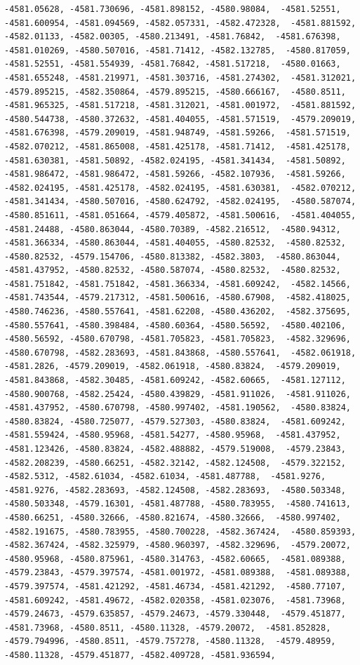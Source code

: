 \documentclass[
]{article}
\begin{document}
\begin{verbatim}
-4581.05628, -4581.730696, -4581.898152, -4580.98084,  -4581.52551, -4581.600954, -4581.094569, -4582.057331, -4582.472328,  -4581.881592, -4582.01133, -4582.00305, -4580.213491, -4581.76842,  -4581.676398, -4581.010269, -4580.507016, -4581.71412, -4582.132785,  -4580.817059, -4581.52551, -4581.554939, -4581.76842, -4581.517218,  -4580.01663, -4581.655248, -4581.219971, -4581.303716, -4581.274302,  -4581.312021, -4579.895215, -4582.350864, -4579.895215, -4580.666167,  -4580.8511, -4581.965325, -4581.517218, -4581.312021, -4581.001972,  -4581.881592, -4580.544738, -4580.372632, -4581.404055, -4581.571519,  -4579.209019, -4581.676398, -4579.209019, -4581.948749, -4581.59266,  -4581.571519, -4582.070212, -4581.865008, -4581.425178, -4581.71412,  -4581.425178, -4581.630381, -4581.50892, -4582.024195, -4581.341434,  -4581.50892, -4581.986472, -4581.986472, -4581.59266, -4582.107936,  -4581.59266, -4582.024195, -4581.425178, -4582.024195, -4581.630381,  -4582.070212, -4581.341434, -4580.507016, -4580.624792, -4582.024195,  -4580.587074, -4580.851611, -4581.051664, -4579.405872, -4581.500616,  -4581.404055, -4581.24488, -4580.863044, -4580.70389, -4582.216512,  -4580.94312, -4581.366334, -4580.863044, -4581.404055, -4580.82532,  -4580.82532, -4580.82532, -4579.154706, -4580.813382, -4582.3803,  -4580.863044, -4581.437952, -4580.82532, -4580.587074, -4580.82532,  -4580.82532, -4581.751842, -4581.751842, -4581.366334, -4581.609242,  -4582.14566, -4581.743544, -4579.217312, -4581.500616, -4580.67908,  -4582.418025, -4580.746236, -4580.557641, -4581.62208, -4580.436202,  -4582.375695, -4580.557641, -4580.398484, -4580.60364, -4580.56592,  -4580.402106, -4580.56592, -4580.670798, -4581.705823, -4581.705823,  -4582.329696, -4580.670798, -4582.283693, -4581.843868, -4580.557641,  -4582.061918, -4581.2826, -4579.209019, -4582.061918, -4580.83824,  -4579.209019, -4581.843868, -4582.30485, -4581.609242, -4582.60665,  -4581.127112, -4580.900768, -4582.25424, -4580.439829, -4581.911026,  -4581.911026, -4581.437952, -4580.670798, -4580.997402, -4581.190562,  -4580.83824, -4580.83824, -4580.725077, -4579.527303, -4580.83824,  -4581.609242, -4581.559424, -4580.95968, -4581.54277, -4580.95968,  -4581.437952, -4581.123426, -4580.83824, -4582.488882, -4579.519008,  -4579.23843, -4582.208239, -4580.66251, -4582.32142, -4582.124508,  -4579.322152, -4582.5312, -4582.61034, -4582.61034, -4581.487788,  -4581.9276, -4581.9276, -4582.283693, -4582.124508, -4582.283693,  -4580.503348, -4580.503348, -4579.16301, -4581.487788, -4580.783955,  -4580.741613, -4580.66251, -4580.32666, -4580.821674, -4580.32666,  -4580.997402, -4582.191675, -4580.783955, -4580.700228, -4582.367424,  -4580.859393, -4582.367424, -4582.325979, -4580.960397, -4582.329696,  -4579.20072, -4580.95968, -4580.875961, -4580.314763, -4582.60665,  -4581.089388, -4579.23843, -4579.397574, -4581.001972, -4581.089388,  -4581.089388, -4579.397574, -4581.421292, -4581.46734, -4581.421292,  -4580.77107, -4581.609242, -4581.49672, -4582.020358, -4581.023076,  -4581.73968, -4579.24673, -4579.635857, -4579.24673, -4579.330448,  -4579.451877, -4581.73968, -4580.8511, -4580.11328, -4579.20072,  -4581.852828, -4579.794996, -4580.8511, -4579.757278, -4580.11328,  -4579.48959, -4580.11328, -4579.451877, -4582.409728, -4581.936594,  
\end{verbatim}
\end{document}
